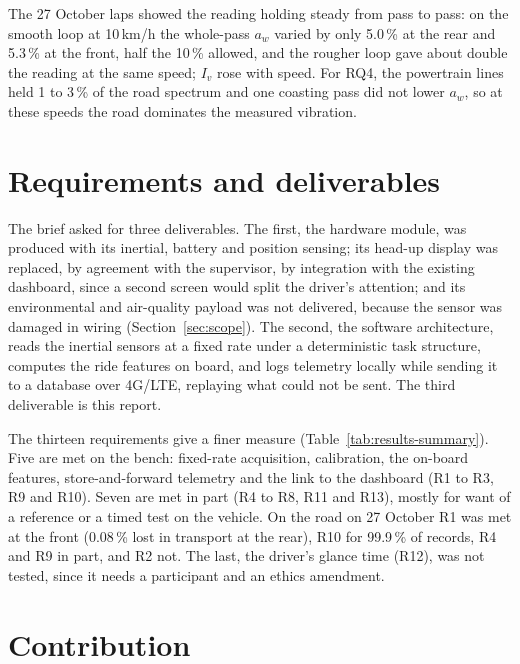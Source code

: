 The 27 October laps showed the reading holding steady from pass to pass: on the smooth loop at 10\,km/h the whole-pass $a_w$ varied by only 5.0\,\% at the rear and 5.3\,\% at the front, half the 10\,\% allowed, and the rougher loop gave about double the reading at the same speed; $I_v$ rose with speed. For RQ4, the powertrain lines held 1 to 3\,\% of the road spectrum and one coasting pass did not lower $a_w$, so at these speeds the road dominates the measured vibration.

\section{Requirements and deliverables}
\label{sec:conc-reqs}

The brief asked for three deliverables. The first, the hardware module, was produced with its inertial, battery and position sensing; its head-up display was replaced, by agreement with the supervisor, by integration with the existing dashboard, since a second screen would split the driver's attention; and its environmental and air-quality payload was not delivered, because the sensor was damaged in wiring (Section~\ref{sec:scope}). The second, the software architecture, reads the inertial sensors at a fixed rate under a deterministic task structure, computes the ride features on board, and logs telemetry locally while sending it to a database over 4G/LTE, replaying what could not be sent. The third deliverable is this report.

The thirteen requirements give a finer measure (Table~\ref{tab:results-summary}). Five are met on the bench: fixed-rate acquisition, calibration, the on-board features, store-and-forward telemetry and the link to the dashboard (R1 to R3, R9 and R10). Seven are met in part (R4 to R8, R11 and R13), mostly for want of a reference or a timed test on the vehicle. On the road on 27 October R1 was met at the front (0.08\,\% lost in transport at the rear), R10 for 99.9\,\% of records, R4 and R9 in part, and R2 not. The last, the driver's glance time (R12), was not tested, since it needs a participant and an ethics amendment.

\section{Contribution}
\label{sec:conc-contribution}

